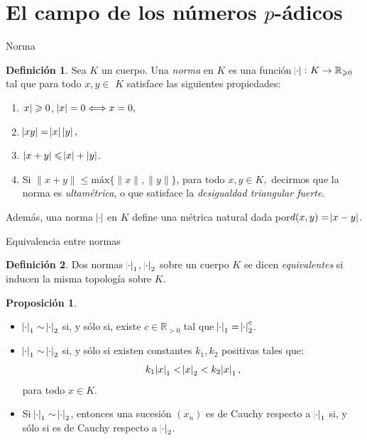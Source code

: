 \documentclass{beamer}
\newcommand{\bb}[1]{\mathbb{#1}}
\theoremstyle{definition}
\numberwithin{equation}{section}
\newcommand{\marine}[1]{\textcolor{defColor}{#1}}
\newcommand{\orangee}[1]{\textcolor{thColor}{#1}}
\newtheorem{df}{\marine{Definición}}
\newtheorem{pr}{\orangee{Proposición}}
\newcommand{\tit}[1]{\textit{#1}}
\renewcommand{\geq}{\geqslant}
\renewcommand{\leq}{\leqslant}
\newcommand{\R}{\mathbb{R}}
\newcommand{\maxx}[1]{\text{m\'ax} #1}
\begin{document}
\section{El campo de los números $p$-ádicos}
\begin{frame}{Norma}
\begin{df}\label{pnorm}
	Sea $K$ un cuerpo. Una \textit{norma} en $K$ es una función
	$\abs{\cdot}\colon K \to \R_{\geq 0}$ tal que para todo $x,y\in$ $K$
	satisface las siguientes propiedades:
	
	\begin{enumerate}[<+- | alert@+>]
		\item $\abs{x} \geq0$, $\abs{x}
		=0\Longleftrightarrow x=0,$
		
		\item $\abs{xy}  =\abs{x} \left\vert 
		y\right\vert ,$
		
		\item $\left\vert x+y\right\vert \leq\abs{x} +\left\vert y\right\vert$.
		\item Si $\|x+y\| \le \maxx\{\|x\|, \|y\|\}$, para todo $x,y\in K,$ decirmos que la norma es \tit{ultamétrica}, o que satisface la \tit{desigualdad triangular fuerte}.
	\end{enumerate}
\end{df}
	Además, una norma $\abs{\cdot}$ en $K$ define una métrica natural dada por\linebreak ${d (x,y)=\abs{x-y}}$.
\end{frame}
\begin{frame}{Equivalencia entre normas}
\begin{df}
	Dos normas $\abs{\cdot}_1$, $\abs{\cdot}_2$ sobre un cuerpo $K$ se dicen \tit{equivalentes }si inducen la misma topología sobre $K$.
\end{df}

\begin{pr}\label{quiv_power}
	\begin{itemize}[<+- | alert@+>]
		\item $\abs{\cdot}_1\sim\abs{\cdot}_2$ si, y sólo si, existe $c\in\bb{R}_{>0}$ tal que $\abs{\cdot}_1=\abs{\cdot}_2^c$.
		\item $\abs{\cdot}_1\sim\abs{\cdot}_2$ si, y sólo si existen constantes $k_1,k_2$ positivas tales que:
		$$k_1\abs{x}_1<\abs{x}_2< k_2\abs{x}_1,$$
		para todo $x\in K$.
		\item Si ${\abs{\cdot}_1\sim\abs{\cdot}_2}$, entonces una sucesión $ (x_n)$ es de Cauchy respecto a $\abs{\cdot}_1$ si, y sólo si es de Cauchy respecto a $\abs{\cdot}_2$.
	\end{itemize}

\end{pr}
\end{frame}
\end{document}
